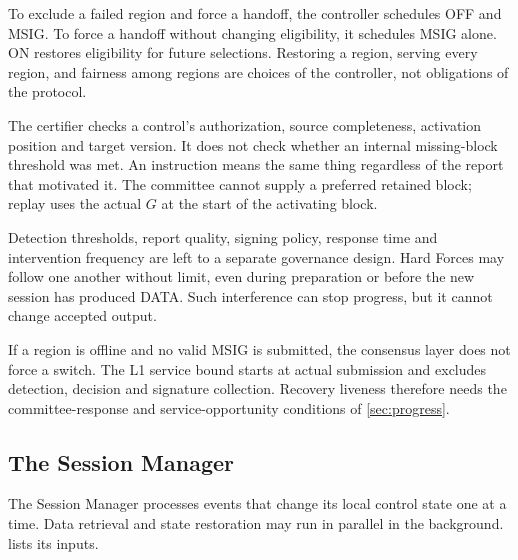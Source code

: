 \documentclass[11pt,a4paper]{article}
\newcounter{protocol}
\begin{document}
To exclude a failed region and force a handoff, the controller schedules
OFF and MSIG. To force a handoff without changing eligibility, it
schedules MSIG alone. ON restores eligibility for future selections.
Restoring a region, serving every region, and fairness among regions are
choices of the controller, not obligations of the protocol.

The certifier checks a control's authorization, source completeness,
activation position and target version. It does not check whether an
internal missing-block threshold was met. An instruction means the same
thing regardless of the report that motivated it. The committee cannot
supply a preferred retained block; replay uses the actual $G$ at the
start of the activating block.

Detection thresholds, report quality, signing policy, response time and
intervention frequency are left to a separate governance design. Hard
Forces may follow one another without limit, even during preparation or
before the new session has produced DATA. Such interference can stop
progress, but it cannot change accepted output.

If a region is offline and no valid MSIG is submitted, the consensus
layer does not force a switch. The L1 service bound starts at actual
submission and excludes detection, decision and signature collection.
Recovery liveness therefore needs the committee-response and
service-opportunity conditions of \cref{sec:progress}.

\subsection{The Session Manager}
\label{sec:session-manager}
The Session Manager processes events that change its local control
state one at a time. Data retrieval and state restoration may run in
parallel in the background.  lists its inputs.
\end{document}
